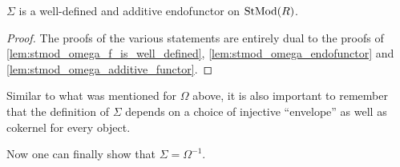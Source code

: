 \begin{lemma}
    \label{lem:stmod_sigma_well-defined_additive_endofunctor}
    \( \Sigma \) is a well-defined and additive endofunctor on \( \operatorname{StMod}(R) \).
\end{lemma}
\begin{proof}
    The proofs of the various statements are entirely dual to the proofs of \autoref{lem:stmod_omega_f_is_well_defined}, \autoref{lem:stmod_omega_endofunctor} and \autoref{lem:stmod_omega_additive_functor}.
\end{proof}

Similar to what was mentioned for \( \Omega \) above, it is also important to remember that the definition of \( \Sigma \) depends on a choice of injective ``envelope'' as well as cokernel for every object.

Now one can finally show that \( \Sigma = \Omega^{-1} \).

